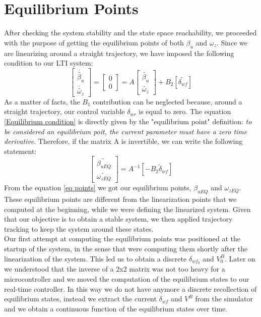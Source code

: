 	\section{Equilibrium Points}
	After checking the system stability and the state space reachability, we proceeded with the purpose of getting the equilibrium points of both $\beta_{u}$ and $\omega_{z}$. Since we are linearizing around a straight trajectory, we have imposed the following condition to our LTI system:
	\begin{equation} \label{Equilibrium condition}
	\begin{bmatrix}
	\dot{\tilde{\beta_{u}}} \\
	\dot{\tilde{\omega_{z}}}
	\end{bmatrix} =
	\begin{bmatrix}
	0 \\
	0
	\end{bmatrix} = A
	\begin{bmatrix}
	\tilde{\beta_{u}} \\
	\tilde{\omega_{z}}
	\end{bmatrix}
	 + B_{2}[\tilde{\delta_{wf}}]
	\end{equation}
	As a matter of facts, the $B_{1}$ contribution can be neglected because, around a straight trajectory, our control variable $\delta_{wr}$ is equal to zero. The equation \ref{Equilibrium condition} is directly given by the "equilibrium point" definition: \textit{to be considered an equilibrium poit, the current parameter must have a zero time derivative}. Therefore, if the matrix A is invertible, we can write the following statement:
	\begin{equation} \label{eq points}
	\begin{bmatrix}
	\tilde{\beta_{uEQ}} \\
	\tilde{\omega_{zEQ}}
	\end{bmatrix} =
	A^{-1}[- B_{2} \tilde\delta_{wf}]
	\end{equation}
	From the equation \ref{eq points} we got our equilibrium points, $\beta_{uEQ}$ and $\omega_{zEQ}$. These equilibrium points are different from the linearization points that we computed at the beginning, while we were defining the linearized system. Given that our objective is to obtain a stable system, we then applied trajectory tracking to keep the system around these states.\\
	Our first attempt at computing the equilibrium points was positioned at the startup of the system, in the sense that were computing them shortly after the linearization of the system. This led us to obtain a discrete $\delta_{wf_{0}}$ and $V_{0}^B$. Later on we understood that the inverse of a 2x2 matrix was not too heavy for a microcontroller and we moved the computation of the equilibrium states to our real-time controller. In this way we do not have anymore a discrete recollection of equilibrium states, instead we extract the current $\delta_{wf}$ and $V^B$ from the simulator and we obtain a continuous function of the equilibrium states over time.

